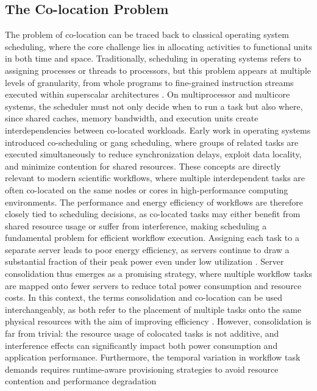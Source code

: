 \subsection{The Co-location Problem}
\label{sec:background_colocation}
The problem of co-location can be traced back to classical operating system scheduling, where the core challenge lies in allocating activities to functional units in both time and space. Traditionally, scheduling in operating systems refers to assigning processes or threads to processors, but this problem appears at multiple levels of granularity, from whole programs to fine-grained instruction streams executed within superscalar architectures \cite{5702048}. On multiprocessor and multicore systems, the scheduler must not only decide when to run a task but also where, since shared caches, memory bandwidth, and execution units create interdependencies between co-located workloads. Early work in operating systems introduced co-scheduling or gang scheduling, where groups of related tasks are executed simultaneously to reduce synchronization delays, exploit data locality, and minimize contention for shared resources. These concepts are directly relevant to modern scientific workflows, where multiple interdependent tasks are often co-located on the same nodes or cores in high-performance computing environments. The performance and energy efficiency of workflows are therefore closely tied to scheduling decisions, as co-located tasks may either benefit from shared resource usage or suffer from interference, making scheduling a fundamental problem for efficient workflow execution.
Assigning each task to a separate server leads to poor energy efficiency, as servers continue to draw a substantial fraction of their peak power even under low utilization \cite{6193474} \cite{Kuity_2023}. Server consolidation thus emerges as a promising strategy, where multiple workflow tasks are mapped onto fewer servers to reduce total power consumption and resource costs. In this context, the terms consolidation and co-location can be used interchangeably, as both refer to the placement of multiple tasks onto the same physical resources with the aim of improving efficiency \cite{5644899}. However, consolidation is far from trivial: the resource usage of colocated tasks is not additive, and interference effects can significantly impact both power consumption and application performance. Furthermore, the temporal variation in workflow task demands requires runtime-aware provisioning strategies to avoid resource contention and performance degradation \cite{5644899}

